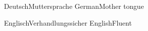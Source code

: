 

\begin{cventries}
    \msinglecventry%
    {Deutsch}{Muttersprache}{}%
    {German}{Mother tongue}{}

    \msinglecventry%
    {Englisch}{Verhandlungssicher}{}%
    {English}{Fluent}{}
\end{cventries}
